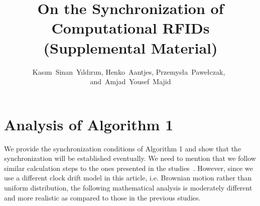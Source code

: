 \documentclass[10pt,journal,compsoc]{IEEEtran}
\begin{document}
\title{On the Synchronization of Computational RFIDs \\
(Supplemental Material)}

\author{Kas{\i}m~Sinan~Y{\i}ld{\i}r{\i}m, 
	Henko~Aantjes, 
	Przemys{\l}a~Pawe{\l}czak,~ 
	and~Amjad~Yousef~Majid
}

\maketitle

\IEEEdisplaynontitleabstractindextext

\IEEEpeerreviewmaketitle


\appendices
\section{Analysis of Algorithm 1}

We provide the synchronization conditions of Algorithm 1 and show that the synchronization will be established eventually. We need to mention that we follow similar calculation steps to the ones presented in the studies~\cite{pi2015,Yildirim:Gradient:2016}. However, since we use a different clock drift model in this article, i.e. Brownian motion rather than uniform distribution, the following  mathematical analysis is moderately different and more realistic as compared to those in the previous studies. 
\end{document}
